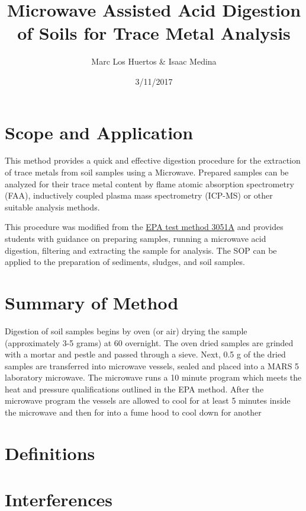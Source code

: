 \documentclass[12pt]{../SOP3_alpha}\usepackage[]{graphicx}\usepackage[]{color}
\title{Microwave Assisted Acid Digestion of Soils for Trace Metal Analysis}
\date{3/11/2017}
\author{Marc Los Huertos \& Isaac Medina}
\begin{document}
\maketitle

\section{Scope and Application}

\NP This method provides a quick and effective digestion procedure for the extraction of trace metals from soil samples using a Microwave. Prepared samples can be analyzed for their trace metal content by flame atomic absorption spectrometry (FAA), inductively coupled plasma mass spectrometry (ICP-MS) or other suitable analysis methods. 

\NP This procedure was modified from the \href{https://www.google.com/url?sa=t&rct=j&q=&esrc=s&source=web&cd=1&cad=rja&uact=8&ved=0ahUKEwjNmefY3tfWAhVP92MKHatgCaQQFggqMAA&url=https%3A%2F%2Fwww.epa.gov%2Fsites%2Fproduction%2Ffiles%2F2015-12%2Fdocuments%2F3051a.pdf&usg=AOvVaw1LPlngQyM_L4Zu4SC-sATE}{EPA test method 3051A} and provides students with guidance on preparing samples, running a microwave acid digestion, filtering and extracting the sample for analysis. 
\NP The SOP can be applied to the preparation of sediments, sludges, and soil samples.

\section{Summary of Method}
Digestion of soil samples begins by oven (or air) drying the sample (approximately 3-5 grams) at 60 \textcelsius{} overnight. The oven dried samples are grinded with a mortar and pestle and passed through a sieve. Next, 0.5 g  of the dried samples are transferred into microwave vessels, sealed and placed into a MARS 5 laboratory microwave. The microwave runs a 10 minute program which meets the heat and pressure qualifications outlined in the EPA method. After the microwave program the vessels are allowed to cool for at least 5 minutes inside the microwave and then for into a fume hood to cool down for another

\tableofcontents

\newpage

\section{Definitions}
\section{Interferences}
\end{document}
